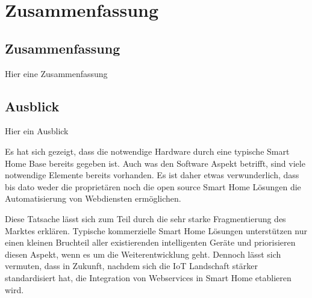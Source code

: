 \chapter{Zusammenfassung}
\label{chap:ausblick}

\section{Zusammenfassung}
Hier eine Zusammenfassung




\section{Ausblick}
Hier ein Ausblick

Es hat sich gezeigt, dass die notwendige Hardware durch eine typische Smart Home Base bereits gegeben ist. Auch was den Software Aspekt betrifft, sind viele notwendige Elemente bereits vorhanden. Es ist daher etwas verwunderlich, dass bis dato weder die proprietären noch die open source Smart Home Lösungen die Automatisierung von Webdiensten ermöglichen. 

Diese Tatsache lässt sich zum Teil durch die sehr starke Fragmentierung des Marktes erklären. Typische kommerzielle Smart Home Lösungen unterstützen nur einen kleinen Bruchteil aller existierenden intelligenten Geräte und priorisieren diesen Aspekt, wenn es um die Weiterentwicklung geht. Dennoch lässt sich vermuten, dass in Zukunft, nachdem sich die IoT Landschaft stärker standardisiert hat, die Integration von Webservices in Smart Home etablieren wird.
